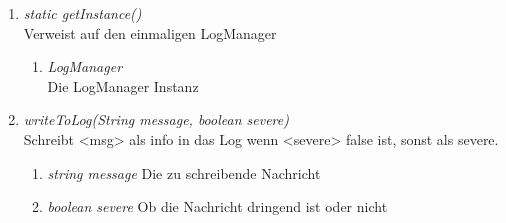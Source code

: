 \begin{enumerate}[+]

	\item \textit{static getInstance()}  \\ Verweist auf den einmaligen LogManager
	
	\vspace{-0.2cm}
	\begin{enumerate}[$\circ$]
		\item \textit{LogManager} \\ Die LogManager Instanz
	\end{enumerate}

\item \textit{writeToLog(String message, boolean severe)} \\ Schreibt <msg> als info in das Log wenn <severe> false ist,
sonst als severe.
\begin{enumerate}[$\bullet$]
\item \textit{string message} Die zu schreibende Nachricht
\item \textit{boolean severe} Ob die Nachricht dringend ist oder nicht
\end{enumerate}
\end{enumerate}


	